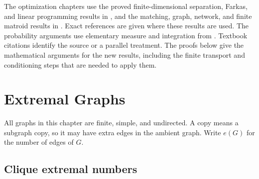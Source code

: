 \documentclass[11pt,oneside,openany]{book}
\theoremstyle{plain}
\theoremstyle{definition}
\theoremstyle{remark}
\begin{document}
The optimization chapters use the proved finite-dimensional
separation, Farkas, and linear programming results in \cite{p106},
and the matching, graph, network, and finite matroid results in
\cite{p204}. Exact references are given where these results are used.
The probability arguments use elementary measure and integration
from \cite{d11}. Textbook citations identify the source or a parallel
treatment. The proofs below give the mathematical arguments for the
new results, including the finite transport and conditioning steps
that are needed to apply them.

\mainmatter
\chapter{Extremal Graphs}

All graphs in this chapter are finite, simple, and undirected. A copy
means a subgraph copy, so it may have extra edges in the ambient graph.
Write \(e(G)\) for the number of edges of \(G\).

\section{Clique extremal numbers}
\end{document}
